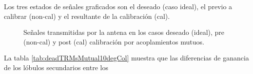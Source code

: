 Los tres estados de señales graficados son el deseado (caso ideal), el previo a calibrar (non-cal) y el resultante de la
calibración (cal). 
\begin{figure}[H]
	\centering

	\caption{Señales transmitidas por la antena en los casos deseado (ideal), pre (non-cal) y post (cal) calibración por acoplamientos mutuos.}
	\label{fig:deadTRMsMutual10degCol}
\end{figure}
La tabla \ref{tab:deadTRMsMutual10degCol} muestra que las diferencias de ganancia de los lóbulos secundarios entre los 

